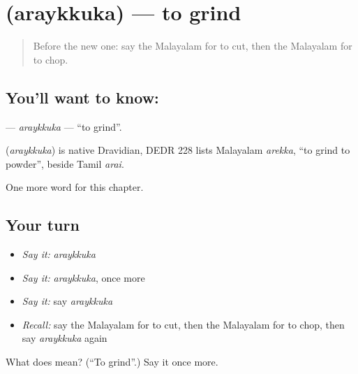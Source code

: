 \section[\texorpdfstring{\ml{അരയ്ക്കുക} (araykkuka)}{അരയ്ക്കുക (araykkuka)}]{ (araykkuka) — to grind}

\label{lesson:ML-C302-araykkuka}



\begin{quote}
Before the new one: say the Malayalam for to cut, then the Malayalam for to chop.
\end{quote}

\subsection*{You'll want to know: }
\textbf{} — \emph{araykkuka} — \textquotedblleft{}to grind\textquotedblright{}.

\begin{cousinweb}
\textbf{} (\emph{araykkuka}) is native Dravidian, DEDR 228 lists Malayalam \emph{arekka}, \textquotedblleft{}to grind to powder\textquotedblright{}, beside Tamil \emph{arai}.
\end{cousinweb}

\begin{grammarlens}[title={What you've built}]
One more word for this chapter.
\end{grammarlens}

\subsection*{Your turn}
\begin{itemize}
\raggedright
  \item \emph{Say it:} \emph{araykkuka}
  \item \emph{Say it:} \emph{araykkuka}, once more
  \item \emph{Say it:} say \emph{araykkuka}
  \item \emph{Recall:} say the Malayalam for to cut, then the Malayalam for to chop, then say \emph{araykkuka} again
\end{itemize}

\begin{tcolorbox}[breakable,colback=teal!4,colframe=teal!35!black,title={Before you move on}]
What does  mean? (\textquotedblleft{}To grind\textquotedblright{}.) Say it once more.
\end{tcolorbox}
